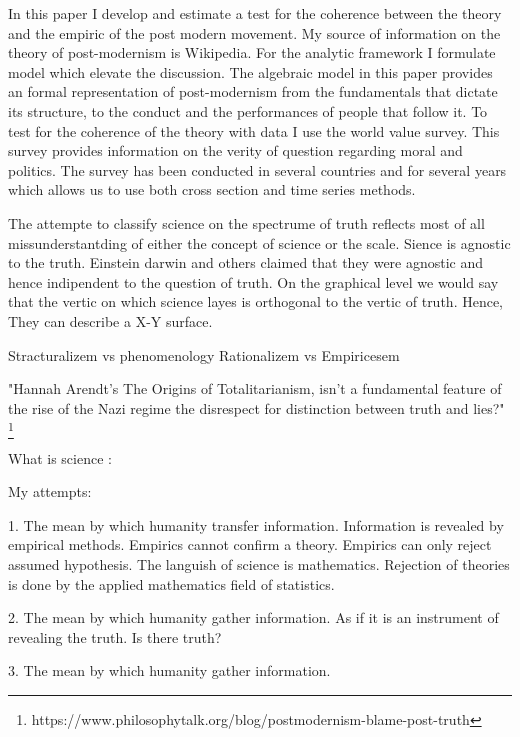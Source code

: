 \documentclass[14pt,oneside]{amsart}
\begin{document}
\bigskip

In this paper I develop and estimate a test for the coherence between the theory and the empiric of the post modern movement. My source of information on the theory of post-modernism is Wikipedia. For the analytic framework I formulate model which elevate the discussion. The algebraic model in this paper provides an formal representation of post-modernism from the fundamentals that dictate its structure, to the conduct and the performances of people that follow it. To test for the coherence of the theory with data I use the world value survey. This survey provides information on the verity of question regarding moral and politics. The survey has been conducted in several countries and for several years which allows us to use both cross section and time series methods. 

\bigskip

The attempte to classify science on the spectrume of truth reflects most of all missunderstantding of either the concept of science or the scale. Sience is agnostic to the truth. Einstein darwin and others claimed that they were agnostic and hence indipendent to the question of truth. On the graphical level we would say that the vertic on which science layes is orthogonal to the vertic of truth. Hence, They can describe a X-Y surface.   
\bigskip

Stracturalizem vs phenomenology
Rationalizem vs Empiricesem
 

\bigskip



"Hannah Arendt's The Origins of Totalitarianism, isn't a fundamental feature of the rise of the Nazi regime the disrespect for distinction between truth and lies?" \footnote{https://www.philosophytalk.org/blog/postmodernism-blame-post-truth}


What is science :

My attempts:

1. The mean by which humanity transfer information.
	Information is revealed by empirical methods.
	Empirics cannot confirm a theory.
	Empirics can only reject assumed hypothesis.
	The languish of science is mathematics.
	Rejection of theories is done by the applied mathematics field of statistics.

2. The mean by which humanity gather information.
	As if it is an instrument of revealing the truth.
	Is there truth? 
	
3. The mean by which humanity gather information.
\end{document}
